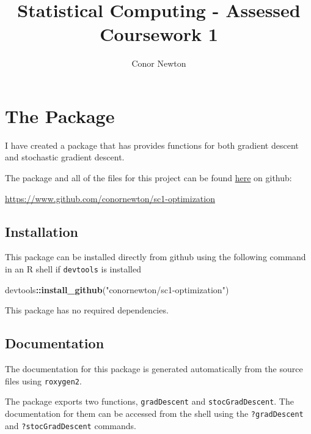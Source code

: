 \documentclass[12pt,]{article}
\title{Statistical Computing - Assessed Coursework 1}
\author{Conor Newton}
\date{}
\newenvironment{Shaded}{\begin{snugshade}}{\end{snugshade}}
\newcommand{\KeywordTok}[1]{\textcolor[rgb]{0.13,0.29,0.53}{\textbf{#1}}}
\newcommand{\NormalTok}[1]{#1}
\newcommand{\OperatorTok}[1]{\textcolor[rgb]{0.81,0.36,0.00}{\textbf{#1}}}
\newcommand{\StringTok}[1]{\textcolor[rgb]{0.31,0.60,0.02}{#1}}
\begin{document}
\maketitle

{
\setcounter{tocdepth}{3}
\tableofcontents
}
\newpage

\hypertarget{the-package}{%
\section{The Package}\label{the-package}}

I have created a package that has provides functions for both gradient
descent and stochastic gradient descent.

The package and all of the files for this project can be found
\href{https://www.github.com/conornewton/sc1-optimization}{here} on
github:

\url{https://www.github.com/conornewton/sc1-optimization}

\hypertarget{installation}{%
\subsection{Installation}\label{installation}}

This package can be installed directly from github using the following
command in an R shell if \texttt{devtools} is installed

\begin{Shaded}
\begin{Highlighting}[]
\NormalTok{    devtools}\OperatorTok{::}\KeywordTok{install_github}\NormalTok{(}\StringTok{"conornewton/sc1-optimization"}\NormalTok{)}
\end{Highlighting}
\end{Shaded}

This package has no required dependencies.

\hypertarget{documentation}{%
\subsection{Documentation}\label{documentation}}

The documentation for this package is generated automatically from the
source files using \texttt{roxygen2}.

The package exports two functions, \texttt{gradDescent} and
\texttt{stocGradDescent}. The documentation for them can be accessed
from the shell using the \texttt{?gradDescent} and
\texttt{?stocGradDescent} commands.
\end{document}
